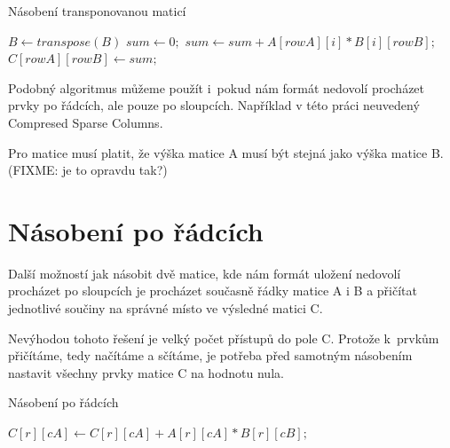 \documentclass[thesis=B,czech]{FITthesis}[2012/06/26]
\begin{document}
\begin{algorithm}
	\caption{Násobení transponovanou maticí}\label{mmm-transpose}
	\begin{algorithmic}[1]
\State \texttt{$B \gets transpose(B)$}
		\State \texttt{$sum \gets 0;$}
			\State \texttt{$sum \gets sum + A[rowA][i] * B[i][rowB];$}
		\EndFor
		\State \texttt{$C[rowA][rowB] \gets sum;$}
	\EndFor
\EndFor
		\EndProcedure
	\end{algorithmic}
\end{algorithm}

Podobný algoritmus můžeme použít i~pokud nám formát nedovolí procházet prvky po řádcích, ale pouze po sloupcích. Například v této práci neuvedený Compresed Sparse Columns.

Pro matice musí platit, že výška matice A musí být stejná jako výška matice B. (FIXME: je to opravdu tak?)


\section{Násobení po řádcích}

Další možností jak násobit dvě matice, kde nám formát uložení nedovolí procházet po sloupcích je procházet současně řádky matice A i B a přičítat jednotlivé součiny na správné místo ve výsledné matici C.

Nevýhodou tohoto řešení je velký počet přístupů do pole C. Protože k~prvkům přičítáme, tedy načítáme a sčítáme, je potřeba před samotným násobením nastavit všechny prvky matice C na hodnotu nula.


\begin{algorithm}
	\caption{Násobení po řádcích}\label{mmm-by-rows}
	\begin{algorithmic}[1]
			\State \texttt{$C[r][cA] \gets C[r][cA] + A[r][cA] * B[r][cB];$}
		\EndFor
	\EndFor
\EndFor
		\EndProcedure
	\end{algorithmic}
\end{algorithm}
\end{document}
